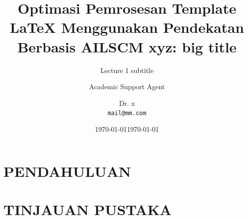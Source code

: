 \documentclass{beamer}
\title{Optimasi Pemrosesan Template LaTeX Menggunakan Pendekatan Berbasis AI}
\author{Academic Support Agent}
\date{\today}
\begin{document}
\maketitle

\begin{abstract}

\end{abstract}

\chapter{PENDAHULUAN}


\chapter{TINJAUAN PUSTAKA}



\title[Short title]{LSCM xyz:
big title}
\subtitle{Lecture 1 subtitle}
\date{\today}
\author{Dr. x\\
\texttt{mail@mm.com}}

\makeatletter
{}
\makeatother
{}
\end{document}
